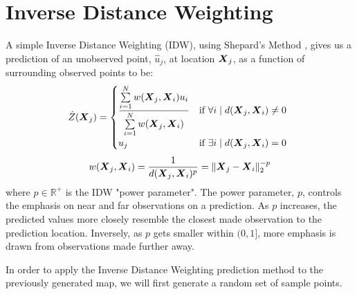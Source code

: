 \documentclass[11pt]{ucthesis}
\newcommand{\vect}[1]{{\it{\boldsymbol{#1}}}}
\begin{document}
\section{Inverse Distance Weighting} \label{idw_intro}
A simple Inverse Distance Weighting (IDW), using Shepard's Method \cite{shepard:idw}, gives us a prediction of an unobserved point, $\hat{u}_j$, at location $\vect{X}_j$, as a function of surrounding observed points to be:
\begin{equation}
	\hat{Z}(\vect{X}_j)=\begin{cases}
			\dfrac{\sum\limits_{i=1}^N w(\vect{X}_j, \vect{X}_i)u_i}{\sum\limits_{i=1}^{N} w(\vect{X}_j, \vect{X}_i)} & \text{if}\ \forall i \mid d(\vect{X}_j,\vect{X}_i) \neq 0\ \\
			u_j & \text{if}\ \exists i \mid d(\vect{X}_j,\vect{X}_i)=0\\
		\end{cases}
\end{equation}
\begin{equation}
	w(\vect{X}_j, \vect{X}_i)=\frac{1}{d(\vect{X}_j,\vect{X}_{i})^{p}}=\|\vect{X}_j-\vect{X}_i\|_{2}^{-p}
\end{equation}
where $p \in \mathbb{R}^{+}$ is the IDW "power parameter". The power parameter, $p$, controls the emphasis on near and far observations on a prediction. As $p$ increases, the predicted values more closely resemble the closest made observation to the prediction location. Inversely, as $p$ gets smaller within $(0, 1]$, more emphasis is drawn from observations made further away.

In order to apply the Inverse Distance Weighting prediction method to the previously generated map, we will first generate a random set of sample points.
\end{document}
